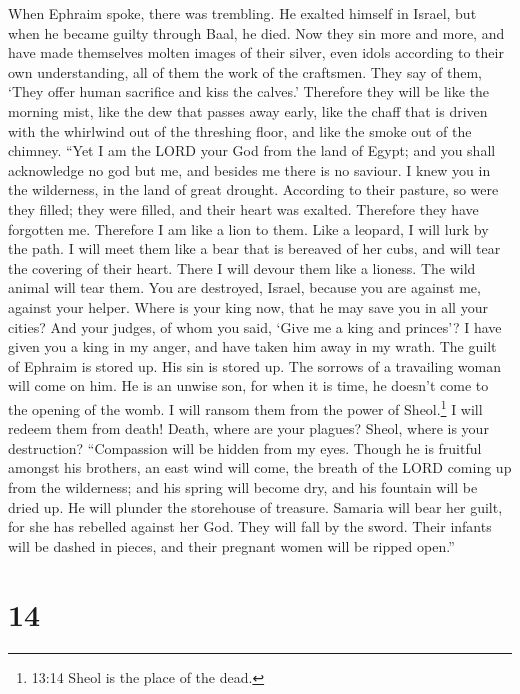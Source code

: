  When Ephraim spoke, there was trembling. He exalted himself
in Israel, but when he became guilty through Baal, he died. 
Now they sin more and more, and have made themselves molten images of
their silver, even idols according to their own understanding, all of
them the work of the craftsmen. They say of them, `They offer human
sacrifice and kiss the calves.'  Therefore they will be like
the morning mist, like the dew that passes away early, like the chaff
that is driven with the whirlwind out of the threshing floor, and like
the smoke out of the chimney.  ``Yet I am the LORD your God
from the land of Egypt; and you shall acknowledge no god but me, and
besides me there is no saviour.  I knew you in the
wilderness, in the land of great drought.  According to
their pasture, so were they filled; they were filled, and their heart
was exalted. Therefore they have forgotten me.  Therefore I
am like a lion to them. Like a leopard, I will lurk by the path.
 I will meet them like a bear that is bereaved of her cubs,
and will tear the covering of their heart. There I will devour them like
a lioness. The wild animal will tear them.  You are
destroyed, Israel, because you are against me, against your helper.
 Where is your king now, that he may save you in all your
cities? And your judges, of whom you said, `Give me a king and princes'?
 I have given you a king in my anger, and have taken him
away in my wrath.  The guilt of Ephraim is stored up. His
sin is stored up.  The sorrows of a travailing woman will
come on him. He is an unwise son, for when it is time, he doesn't come
to the opening of the womb.  I will ransom them from the
power of Sheol.\footnote{13:14 Sheol is the place of the dead.} I will
redeem them from death! Death, where are your plagues? Sheol, where is
your destruction? ``Compassion will be hidden from my eyes.
 Though he is fruitful amongst his brothers, an east wind
will come, the breath of the LORD coming up from the wilderness; and his
spring will become dry, and his fountain will be dried up. He will
plunder the storehouse of treasure.  Samaria will bear her
guilt, for she has rebelled against her God. They will fall by the
sword. Their infants will be dashed in pieces, and their pregnant women
will be ripped open.''

\hypertarget{section-8}{%
\section{14}\label{section-8}}

